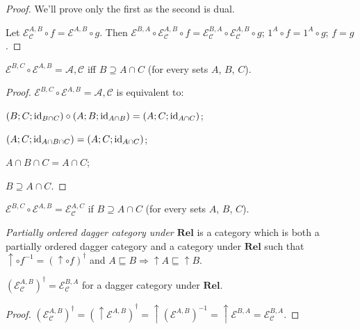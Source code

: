 \begin{proof}
  We'll prove only the first as the second is dual.
  
  Let $\mathcal{E}_{\mathcal{C}}^{A,B} \circ f = \mathcal{E}^{A,B} \circ g$. Then
  $\mathcal{E}^{B,A} \circ \mathcal{E}_{\mathcal{C}}^{A,B}
  \circ f = \mathcal{E}_{\mathcal{C}}^{B,A} \circ \mathcal{E}_{\mathcal{C}}^{A,B} \circ g$;
  $1^A \circ f = 1^A \circ g$; $f = g$.
\end{proof}

\begin{prop}
  $\mathcal{E}^{B,C} \circ \mathcal{E}^{A,B} = \mathcal{A,C}$
  iff $B \supseteq A \cap C$ (for every sets $A$, $B$, $C$).
\end{prop}

\begin{proof}
  $\mathcal{E}^{B,C} \circ \mathcal{E}^{A,B} = \mathcal{A,C}$
  is equivalent to:
  
  $(B ; C ; \operatorname{id}_{B \cap C}) \circ (A ; B ; \operatorname{id}_{A \cap B}) = (A ;
  C ; \operatorname{id}_{A \cap C})$;
  
  $(A ; C ; \operatorname{id}_{A \cap B \cap C}) = (A ; C ; \operatorname{id}_{A \cap C})$;
  
  $A \cap B \cap C = A \cap C$;
  
  $B \supseteq A \cap C$.
\end{proof}

\begin{cor}
  $\mathcal{E}^{B,C} \circ \mathcal{E}^{A,B} = \mathcal{E}_{\mathcal{C}}^{A,C}$ if
  $B \supseteq A \cap C$ (for every sets $A$, $B$, $C$).
\end{cor}

\begin{defn}
  \emph{Partially ordered dagger category under $\mathbf{Rel}$} is
  a category which is both a partially ordered dagger category and a category
  under $\mathbf{Rel}$ such that $\uparrow \circ f^{- 1} = (\uparrow
  \circ f)^{\dagger}$ and $A \sqsubseteq B \Rightarrow \uparrow A \sqsubseteq
  \uparrow B$.
\end{defn}

\begin{prop}
  $(\mathcal{E}_{\mathcal{C}}^{A,B})^{\dagger} = \mathcal{E}_{\mathcal{C}}^{B,A}$ for a dagger category under
  $\mathbf{Rel}$.
\end{prop}

\begin{proof}
  $(\mathcal{E}_{\mathcal{C}}^{A,B})^{\dagger} = (\uparrow \mathcal{E}^{A,B})^{\dagger} = \uparrow (\mathcal{E}^{A,B})^{- 1} =
  \uparrow \mathcal{E}^{B,A} = \mathcal{E}_{\mathcal{C}}^{B,A}$.
\end{proof}

